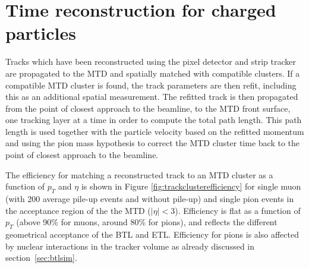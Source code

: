 \section{Time reconstruction for charged particles}
\label{sec:trackreco}
Tracks which have been reconstructed using the pixel detector and strip tracker are propagated to the MTD and spatially matched with compatible clusters.  If a compatible MTD cluster is found, the track parameters are then refit, including this as an additional spatial measurement.  The refitted track is then propagated from the point of closest approach to the beamline, to the MTD front surface, one tracking layer at a time in order to compute the total path length.  This path length is used together with the particle velocity based on the refitted momentum and using the pion mass hypothesis to correct the MTD cluster time back to the point of closest approach to the beamline.  

The efficiency for matching a reconstructed track to an MTD cluster as a function of $p_T$ and $\eta$ is shown in Figure \ref{fig:trackclusterefficiency} for single muon (with 200 average pile-up events and without pile-up) and single pion events in the acceptance region of the the MTD ($|\eta|<3$). Efficiency is flat as a function of $p_{T}$ (above 90\% for muons, around 80\% for pions), and reflects the different geometrical acceptance of the BTL and ETL. Efficiency for pions is also affected by nuclear interactions in the tracker volume as already discussed in section~\ref{sec:btlsim}.

